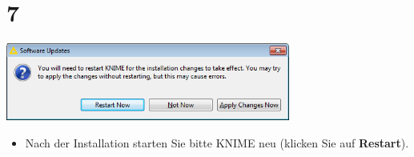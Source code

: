 \documentclass{beamer}
\begin{document}
\section{7}
\begin{frame}
	\begin{center}
  		\includegraphics[width=0.7\textwidth]{7.png}
	\end{center}
	\begin{itemize}
		\item Nach der Installation starten Sie bitte KNIME neu (klicken Sie auf \textbf{Restart}).
	\end{itemize}
\end{frame}
\end{document}
